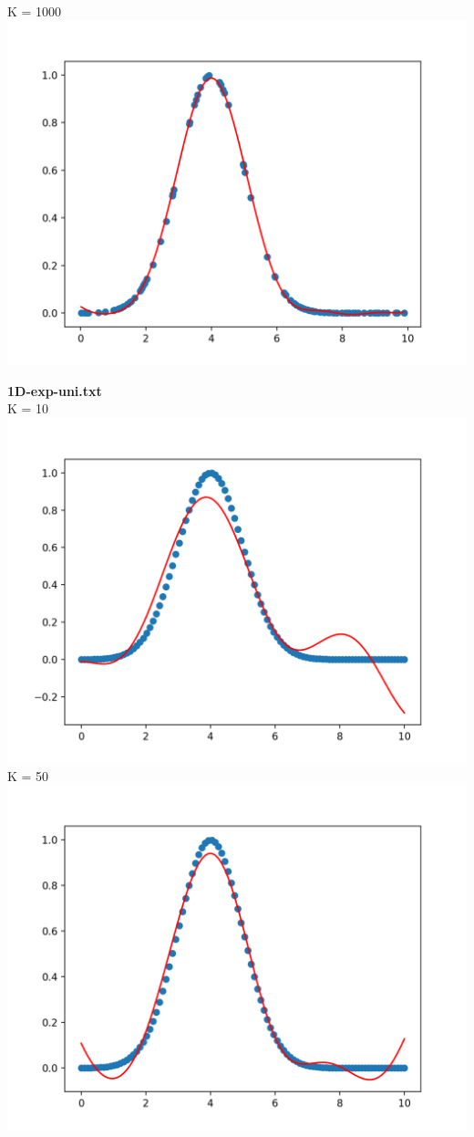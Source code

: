 \documentclass[12pt]{article}
\newcommand{\nextproblem}{
	\vfill
	\pagebreak
}
\begin{document}
\begin{enumerate}
\begin{enumerate}
	\\ K = 1000
	\\ \includegraphics[height=0.3\textheight]{1Dexpsamp1000}
	\nextproblem
	\textbf{1D-exp-uni.txt}
	\\ K = 10
	\\ \includegraphics[height=0.3\textheight]{1Dexpuni10}
	\\ K = 50
	\\ \includegraphics[height=0.3\textheight]{1Dexpuni50}

\end{enumerate}
\end{enumerate}
\end{document}
